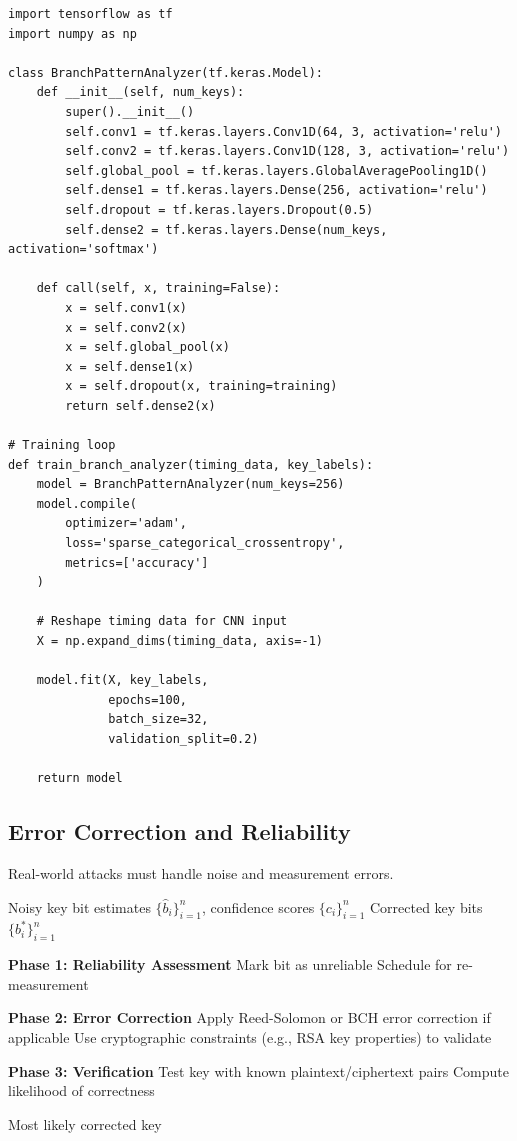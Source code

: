 \documentclass[11pt,a4paper]{article}
\theoremstyle{definition}
\begin{document}
\begin{lstlisting}[caption={Neural Network for Branch Pattern Analysis}]
import tensorflow as tf
import numpy as np

class BranchPatternAnalyzer(tf.keras.Model):
    def __init__(self, num_keys):
        super().__init__()
        self.conv1 = tf.keras.layers.Conv1D(64, 3, activation='relu')
        self.conv2 = tf.keras.layers.Conv1D(128, 3, activation='relu')
        self.global_pool = tf.keras.layers.GlobalAveragePooling1D()
        self.dense1 = tf.keras.layers.Dense(256, activation='relu')
        self.dropout = tf.keras.layers.Dropout(0.5)
        self.dense2 = tf.keras.layers.Dense(num_keys, activation='softmax')
    
    def call(self, x, training=False):
        x = self.conv1(x)
        x = self.conv2(x)
        x = self.global_pool(x)
        x = self.dense1(x)
        x = self.dropout(x, training=training)
        return self.dense2(x)

# Training loop
def train_branch_analyzer(timing_data, key_labels):
    model = BranchPatternAnalyzer(num_keys=256)
    model.compile(
        optimizer='adam',
        loss='sparse_categorical_crossentropy',
        metrics=['accuracy']
    )
    
    # Reshape timing data for CNN input
    X = np.expand_dims(timing_data, axis=-1)
    
    model.fit(X, key_labels, 
              epochs=100, 
              batch_size=32,
              validation_split=0.2)
    
    return model
\end{lstlisting}

\subsection{Error Correction and Reliability}

Real-world attacks must handle noise and measurement errors.

\begin{algorithm}
\caption{Error Correction for Branch Prediction Attacks}
\begin{algorithmic}[1]
\REQUIRE Noisy key bit estimates $\{\hat{b}_i\}_{i=1}^n$, confidence scores $\{c_i\}_{i=1}^n$
\ENSURE Corrected key bits $\{b_i^*\}_{i=1}^n$

\STATE \textbf{Phase 1: Reliability Assessment}
        \STATE Mark bit as unreliable
        \STATE Schedule for re-measurement
    \ENDIF
\ENDFOR

\STATE \textbf{Phase 2: Error Correction}
\STATE Apply Reed-Solomon or BCH error correction if applicable
\STATE Use cryptographic constraints (e.g., RSA key properties) to validate

\STATE \textbf{Phase 3: Verification}
    \STATE Test key with known plaintext/ciphertext pairs
    \STATE Compute likelihood of correctness
\ENDFOR

\RETURN Most likely corrected key
\end{algorithmic}
\end{algorithm}
\end{document}
